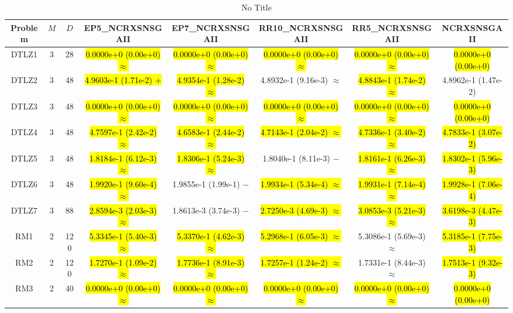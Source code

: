 \documentclass[journal]{IEEEtran}
\begin{document}
\begin{table*}[htbp]
\renewcommand{\arraystretch}{1.2}
\centering
\caption{No Title}
\begin{tabular}{cccccccc}
\toprule
Problem&$M$&$D$&EP5\_NCRXSNSGAII&EP7\_NCRXSNSGAII&RR10\_NCRXSNSGAII&RR5\_NCRXSNSGAII&NCRXSNSGAII\\
\midrule
\multirow{1}{*}{DTLZ1}&3&28&\hl{0.0000e+0 (0.00e+0) $\approx$}&\hl{0.0000e+0 (0.00e+0) $\approx$}&\hl{0.0000e+0 (0.00e+0) $\approx$}&\hl{0.0000e+0 (0.00e+0) $\approx$}&\hl{0.0000e+0 (0.00e+0)}\\
\hline
\multirow{1}{*}{DTLZ2}&3&48&\hl{4.9603e-1 (1.71e-2) $+$}&\hl{4.9354e-1 (1.28e-2) $\approx$}&4.8932e-1 (9.16e-3) $\approx$&\hl{4.8843e-1 (1.74e-2) $\approx$}&4.8962e-1 (1.47e-2)\\
\hline
\multirow{1}{*}{DTLZ3}&3&48&\hl{0.0000e+0 (0.00e+0) $\approx$}&\hl{0.0000e+0 (0.00e+0) $\approx$}&\hl{0.0000e+0 (0.00e+0) $\approx$}&\hl{0.0000e+0 (0.00e+0) $\approx$}&\hl{0.0000e+0 (0.00e+0)}\\
\hline
\multirow{1}{*}{DTLZ4}&3&48&\hl{4.7597e-1 (2.42e-2) $\approx$}&\hl{4.6583e-1 (2.44e-2) $\approx$}&\hl{4.7143e-1 (2.04e-2) $\approx$}&\hl{4.7336e-1 (3.40e-2) $\approx$}&\hl{4.7833e-1 (3.07e-2)}\\
\hline
\multirow{1}{*}{DTLZ5}&3&48&\hl{1.8184e-1 (6.12e-3) $\approx$}&\hl{1.8306e-1 (5.24e-3) $\approx$}&1.8040e-1 (8.11e-3) $-$&\hl{1.8161e-1 (6.26e-3) $\approx$}&\hl{1.8302e-1 (5.96e-3)}\\
\hline
\multirow{1}{*}{DTLZ6}&3&48&\hl{1.9920e-1 (9.60e-4) $\approx$}&1.9855e-1 (1.99e-1) $-$&\hl{1.9934e-1 (5.34e-4) $\approx$}&\hl{1.9931e-1 (7.14e-4) $\approx$}&\hl{1.9928e-1 (7.06e-4)}\\
\hline
\multirow{1}{*}{DTLZ7}&3&88&\hl{2.8594e-3 (2.03e-3) $\approx$}&1.8613e-3 (3.74e-3) $-$&\hl{2.7250e-3 (4.69e-3) $\approx$}&\hl{3.0853e-3 (5.21e-3) $\approx$}&\hl{3.6198e-3 (4.47e-3)}\\
\hline
\multirow{1}{*}{RM1}&2&120&\hl{5.3345e-1 (5.40e-3) $\approx$}&\hl{5.3370e-1 (4.62e-3) $\approx$}&\hl{5.2968e-1 (6.05e-3) $\approx$}&5.3086e-1 (5.69e-3) $\approx$&\hl{5.3185e-1 (7.75e-3)}\\
\hline
\multirow{1}{*}{RM2}&2&120&\hl{1.7270e-1 (1.09e-2) $\approx$}&\hl{1.7736e-1 (8.91e-3) $\approx$}&\hl{1.7257e-1 (1.24e-2) $\approx$}&1.7331e-1 (8.44e-3) $\approx$&\hl{1.7513e-1 (9.32e-3)}\\
\hline
\multirow{1}{*}{RM3}&2&40&\hl{0.0000e+0 (0.00e+0) $\approx$}&\hl{0.0000e+0 (0.00e+0) $\approx$}&\hl{0.0000e+0 (0.00e+0) $\approx$}&\hl{0.0000e+0 (0.00e+0) $\approx$}&\hl{0.0000e+0 (0.00e+0)}\\

\end{tabular}
\end{table*}
\end{document}
